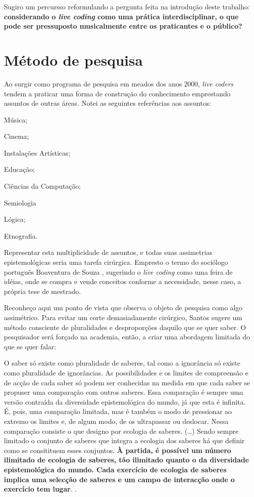 Sugiro um percursso reformulando a pergunta feita na introdução deste trabalho: \textbf{considerando o \emph{live coding} como uma prática interdisciplinar, o que pode ser pressuposto musicalmente entre os praticantes e o público?} 

\section{Método de pesquisa}\label{conjunto_conhecimentos}

Ao surgir como programa de pesquisa em meados dos anos 2000, \emph{live coders} tendem a praticar uma forma de construção do conhecimento emprestando assuntos de outras áreas. Notei as seguintes referências aos assuntos: \begin{inparaenum}[(1)]
\item Música;
\item Cinema;
\item Instalações Artísticas;
\item Educação;
\item Ciências da Computação;
\item Semiologia
\item Lógica;
\item Etnografia.
\end{inparaenum}\label{par:metodo1}

Representar esta multiplicidade de assuntos, e todas suas assimetrias epistemológicas seria uma tarefa cirúrgica. Empresto o termo do sociólogo português Boaventura de Souza , sugerindo o \emph{live coding} como uma feira de idéias, onde se compra e vende conceitos conforme a necessidade, nesse caso, a própria tese de mestrado.

Reconheço aqui um ponto de vista que observa o objeto de pesquisa como algo assimétrico. Para evitar um corte demasiadamente cirúrgico, Santos sugere um método consciente de pluralidades e desproporções daquilo que se quer saber. O pesquisador será forçado na academia, então, a criar uma abordagem limitada do que se quer falar:

\begin{citacao}
O saber só existe como pluralidade de saberes, tal como a ignorância só existe como pluralidade de ignorâncias. As possibilidades e os limites de compreensão e de acção de cada saber só podem ser conhecidas na medida em que cada saber se propuser uma comparação com outros saberes. Essa comparação é sempre uma versão contraída da diversidade epistemológica do mundo, já que esta é infinita. É, pois, uma comparação limitada, mas é também o modo de pressionar ao extremo os limites e, de algum modo, de os ultrapassar ou deslocar. Nessa comparação consiste o que designo por ecologia de saberes. (\ldots) Sendo sempre limitado o conjunto de saberes que integra a ecologia dos saberes há que definir como se consitituem esses conjuntos. \textbf{À partida, é possível um número ilimitado de ecologia de saberes, tão ilimitado quanto o da diversidade epistemológica do mundo. Cada exercício de ecologia de saberes implica uma selecção de saberes e um campo de interacção onde o exercício tem lugar}. \cite[p.~28-30]{santos_filosofia_2008}.
\end{citacao}


